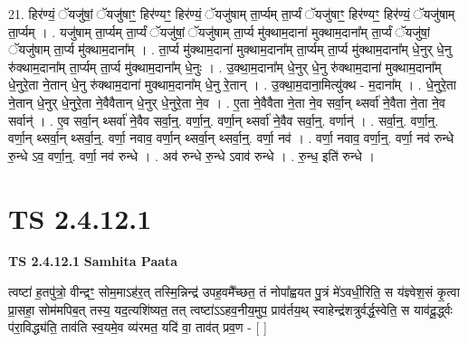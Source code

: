 \documentclass[17pt]{extarticle}
\begin{document}
21. हिर॑ण्यं॒ ॅयजु॑षां॒ ॅयजु॑षाꣳ॒॒ हिर॑ण्यꣳ॒॒ हिर॑ण्यं॒ ॅयजु॑षाम् ता॒र्प्यम् ता॒र्प्यं ॅयजु॑षाꣳ॒॒ हिर॑ण्यꣳ॒॒ हिर॑ण्यं॒ ॅयजु॑षाम् ता॒र्प्यम् । . यजु॑षाम् ता॒र्प्यम् ता॒र्प्यं ॅयजु॑षां॒ ॅयजु॑षाम् ता॒र्प्य मु॑क्थाम॒दाना॑ मुक्थाम॒दाना᳚म् ता॒र्प्यं ॅयजु॑षां॒ ॅयजु॑षाम् ता॒र्प्य मु॑क्थाम॒दाना᳚म् । . ता॒र्प्य मु॑क्थाम॒दाना॑ मुक्थाम॒दाना᳚म् ता॒र्प्यम् ता॒र्प्य मु॑क्थाम॒दाना᳚म् धे॒नुर् धे॒नु रु॑क्थाम॒दाना᳚म् ता॒र्प्यम् ता॒र्प्य मु॑क्थाम॒दाना᳚म् धे॒नुः । . उ॒क्था॒म॒दाना᳚म् धे॒नुर् धे॒नु रु॑क्थाम॒दाना॑ मुक्थाम॒दाना᳚म् धे॒नुरे॒ता ने॒तान् धे॒नु रु॑क्थाम॒दाना॑ मुक्थाम॒दाना᳚म् धे॒नु रे॒तान् । . उ॒क्था॒म॒दाना॒मित्यु॑क्थ - म॒दाना᳚म् । . धे॒नुरे॒ता ने॒तान् धे॒नुर् धे॒नुरे॒ता ने॒वैवैतान् धे॒नुर् धे॒नुरे॒ता ने॒व । . ए॒ता ने॒वैवैता ने॒ता ने॒व सर्वा॒न् थ्सर्वा॑ ने॒वैता ने॒ता ने॒व सर्वान्॑ । . ए॒व सर्वा॒न् थ्सर्वा॑ ने॒वैव सर्वा॒न्॒. वर्णा॒न्॒. वर्णा॒न् थ्सर्वा॑ ने॒वैव सर्वा॒न्॒. वर्णान्॑ । . सर्वा॒न्॒. वर्णा॒न्॒. वर्णा॒न् थ्सर्वा॒न् थ्सर्वा॒न्॒. वर्णा॒ नवाव॒ वर्णा॒न् थ्सर्वा॒न् थ्सर्वा॒न्॒. वर्णा॒ नव॑ । . वर्णा॒ नवाव॒ वर्णा॒न्॒. वर्णा॒ नव॑ रुन्धे रु॒न्धे ऽव॒ वर्णा॒न्॒. वर्णा॒ नव॑ रुन्धे । . अव॑ रुन्धे रु॒न्धे ऽवाव॑ रुन्धे । . रु॒न्ध॒ इति॑ रुन्धे । \newline
\pagebreak
{}

\section{ TS 2.4.12.1 }

\textbf{TS 2.4.12.1 } \newline
\textbf{Samhita Paata} \newline

त्वष्टा॑ ह॒तपु॑त्रो॒ वीन्द्रꣳ॒॒ सोम॒माऽह॑र॒त् तस्मि॒न्निन्द्र॑ उपह॒वमै᳚च्छत॒ तं नोपा᳚ह्वयत पु॒त्रं मे॑ऽवधी॒रिति॒ स य॑ज्ञ्वेश॒सं कृ॒त्वा प्रा॒सहा॒ सोम॑मपिब॒त् तस्य॒ यद॒त्यशि॑ष्यत॒ तत् त्वष्टा॑ऽऽहव॒नीय॒मुप॒ प्राव॑र्तय॒थ् स्वाहेन्द्र॑शत्रुर्वर्द्ध॒स्वेति॒ स याव॑दू॒र्द्ध्वः प॑रा॒विद्ध्य॑ति॒ ताव॑ति स्व॒यमे॒व व्य॑रमत॒ यदि॑ वा॒ ताव॑त् प्रव॒ण - [  ] \newline
\end{document}
